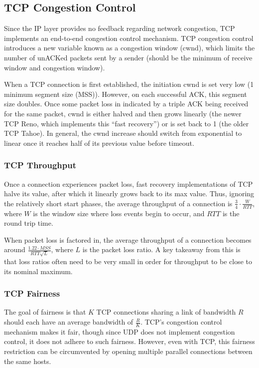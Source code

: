 \documentclass[12pt,titlepage]{article}
\begin{document}
    \subsection{TCP Congestion Control}
      Since the IP layer provides no feedback regarding network congestion, TCP implements an end-to-end congestion control mechanism. TCP congestion control introduces a new variable
      known as a congestion window (cwnd), which limits the number of unACKed packets sent by a sender (should be the minimum of receive window and congestion window).

      When a TCP connection is first established, the initiation cwnd is set very low (1 minimum segment size (MSS)). However, on each successful ACK, this segment size doubles. Once some
      packet loss in indicated by a triple ACK being received for the same packet, cwnd is either halved and then grows linearly (the newer TCP Reno, which implements
      this ``fast recovery'') or is set back to 1 (the older TCP Tahoe).
      In general, the cwnd increase should switch from exponential to linear once it reaches half of its previous value before timeout.

      \subsubsection{TCP Throughput}
        Once a connection experiences packet loss, fast recovery implementations of TCP halve its value, after which it linearly grows back to its max value. Thus, ignoring the relatively
        short start phases, the average throughput of a connection is $\frac{3}{4} \cdot \frac{W}{RTT}$, where $W$ is the window size where loss events begin to occur, and $RTT$ is the
        round trip time.

        When packet loss is factored in, the average throughput of a connection becomes around $\frac{1.22 \cdot MSS}{RTT \sqrt{L}}$, where $L$ is the packet loss ratio. A key takeaway
        from this is that loss ratios often need to be very small in order for throughput to be close to its nominal maximum.

      \subsubsection{TCP Fairness}
        The goal of fairness is that $K$ TCP connections sharing a link of bandwidth $R$ should each have an average bandwidth of $\frac{R}{K}$. TCP's congestion control mechanism makes it
        fair, though since UDP does not implement congestion control, it does not adhere to such fairness. However, even with TCP, this fairness restriction can be circumvented by opening
        multiple parallel connections between the same hosts.
\end{document}
